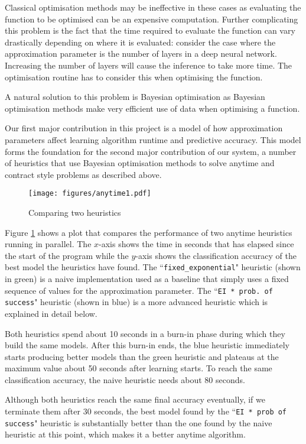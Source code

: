 \documentclass[a4paper,12pt,twoside,openright]{report}
\begin{document}
Classical optimisation methods may be ineffective in these cases as evaluating the function to be optimised can be an expensive computation. Further complicating this problem is the fact that the time required to evaluate the function can vary drastically depending on where it is evaluated: consider the case where the approximation parameter is the number of layers in a deep neural network. Increasing the number of layers will cause the inference to take more time. The optimisation routine has to consider this when optimising the function.

A natural solution to this problem is Bayesian optimisation as Bayesian optimisation methods make very efficient use of data when optimising a function.

Our first major contribution in this project is a model of how approximation parameters affect learning algorithm runtime and predictive accuracy. This model forms the foundation for the second major contribution of our system, a number of heuristics that use Bayesian optimisation methods to solve anytime and contract style problems as described above.

\begin{figure}
\centering
  \texttt{[image: figures/anytime1.pdf]}
  \caption{Comparing two heuristics}
  \label{anytime1}
\end{figure}


Figure \ref{anytime1} shows a plot that compares the performance of two anytime heuristics running in parallel. The $x$-axis shows the time in seconds that has elapsed since the start of the program while the $y$-axis shows the classification accuracy of the best model the heuristics have found. The ``\texttt{fixed\_exponential}" heuristic (shown in green) is a naive implementation used as a baseline that simply uses a fixed sequence of values for the approximation parameter. The ``\texttt{EI * prob.\ of success}" heuristic (shown in blue) is a more advanced heuristic which is explained in detail below. 

Both heuristics spend about 10 seconds in a burn-in phase during which they build the same models. After this burn-in ends, the blue heuristic immediately starts producing better models than the green heuristic and plateaus at the maximum value about 50 seconds after learning starts. To reach the same classification accuracy, the naive heuristic needs about 80 seconds.

Although both heuristics reach the same final accuracy eventually, if we terminate them after 30 seconds, the best model found by the ``\texttt{EI * prob of success}" heuristic is substantially better than the one found by the naive heuristic at this point, which makes it a better anytime algorithm. 
\end{document}
